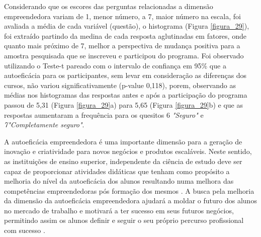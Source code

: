 Considerando que os escores das perguntas relacionadas a dimensão empreendedora variam de 1, menor número, a 7, maior número na escala, foi avaliada a média de cada variável (questão),
o histograma (Figura \ref{figura_29}), foi extraído partindo da medina de cada resposta aglutinadas em fatores, onde quanto mais próximo de 7, melhor a perspectiva de mudança positiva para a amostra pesquisada que se inscreveu e participou do programa. Foi observado utilizando o Teste-t pareado com o intervalo de confiança em 95\%  que a autoeficácia para os participantes, sem levar em consideração as diferenças dos cursos, não variou significativamente (p-value 0,118), porem, observando as médias nos histogramas das respostas antes e após a participação do programa passou de 5,31 (Figura \ref{figura_29}a) para 5,65 (Figura \ref{figura_29}b) e que as respostas aumentaram a frequência para os quesitos 6 \textit{"Seguro"} e \textit{7"Completamente seguro"}.

A autoeficácia empreendedora é uma importante dimensão para a geração de inovação e criatividade para novos negócios e produtos escaláveis. Neste sentido, as instituições de ensino superior, independente da ciência de estudo deve ser capaz de proporcionar atividades didáticas que tenham como propósito a melhoria do nível da autoeficácia dos alunos resultando numa melhora das competências empreendedoras  pós formação dos mesmos \cite{ribeiro_autoeficacia_2019}. A busca pela melhoria da dimensão da autoeficácia empreendedora ajudará a moldar o futuro dos alunos no mercado de trabalho e motivará a ter sucesso em seus futuros negócios, permitindo assim os alunos  definir e seguir o seu próprio percurso profissional com sucesso  \cite{das_examining_2018}.

